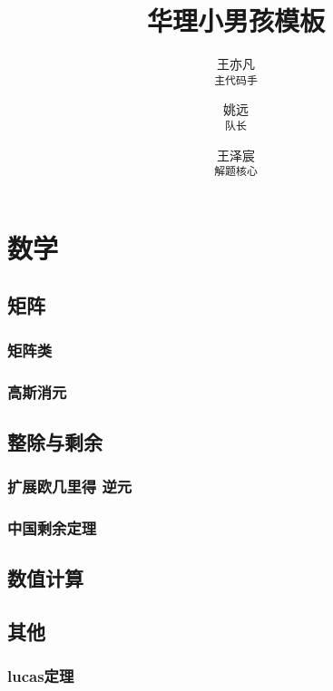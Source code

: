 \documentclass{report}
\begin{document}
\title{华理小男孩模板}
\author{
王亦凡 \\ 
\texttt{主代码手}
\and
姚远 \\ 
\texttt{队长}
\and
王泽宸 \\ 
\texttt{解题核心}
}
\maketitle
\tableofcontents
\newpage



\chapter{数学}
    \section{矩阵}
        \subsection{矩阵类}
            
        \subsection{高斯消元}
            
    \section{整除与剩余}
        \subsection{扩展欧几里得 逆元}
            
        \subsection{中国剩余定理}
            
    \section{数值计算}
    \section{其他}
        \subsection{lucas定理}
            
\end{document}

